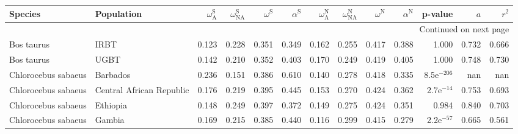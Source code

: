 \begin{longtable}{llrrrrrrrrrrr}
\toprule
             Species &                Population & $\omega_{\textrm{A}}^{\textrm{S}}$ & $\omega_{\textrm{NA}}^{\textrm{S}}$ & $\omega^{\textrm{S}}$ & $\alpha^{\textrm{S}}$ & $\omega_{\textrm{A}}^{\textrm{N}}$ & $\omega_{\textrm{NA}}^{\textrm{N}}$ & $\omega^{\textrm{N}}$ & $\alpha^{\textrm{N}}$ &       p-value &    $a$ &  $r^2$ \\
\midrule
\endhead
\midrule
\multicolumn{13}{r}{{Continued on next page}} \\
\midrule
\endfoot

\bottomrule
\endlastfoot
          Bos taurus &                      IRBT &                              0.123 &                               0.228 &                 0.351 &                 0.349 &                              0.162 &                               0.255 &                 0.417 &                 0.388 &         1.000 &  0.732 &  0.666 \\
          Bos taurus &                      UGBT &                              0.142 &                               0.210 &                 0.352 &                 0.403 &                              0.170 &                               0.249 &                 0.419 &                 0.405 &         1.000 &  0.748 &  0.730 \\
 Chlorocebus sabaeus &                  Barbados &                              0.236 &                               0.151 &                 0.386 &                 0.610 &                              0.140 &                               0.278 &                 0.418 &                 0.335 & 8.5e$^{-206}$ &    nan &    nan \\
 Chlorocebus sabaeus &  Central African Republic &                              0.176 &                               0.219 &                 0.395 &                 0.445 &                              0.153 &                               0.270 &                 0.424 &                 0.362 &  2.7e$^{-14}$ &  0.753 &  0.693 \\
 Chlorocebus sabaeus &                  Ethiopia &                              0.148 &                               0.249 &                 0.397 &                 0.372 &                              0.149 &                               0.275 &                 0.424 &                 0.351 &         0.984 &  0.840 &  0.703 \\
 Chlorocebus sabaeus &                    Gambia &                              0.169 &                               0.215 &                 0.385 &                 0.440 &                              0.116 &                               0.299 &                 0.415 &                 0.279 &  2.2e$^{-57}$ &  0.665 &  0.561 \\

\end{longtable}
